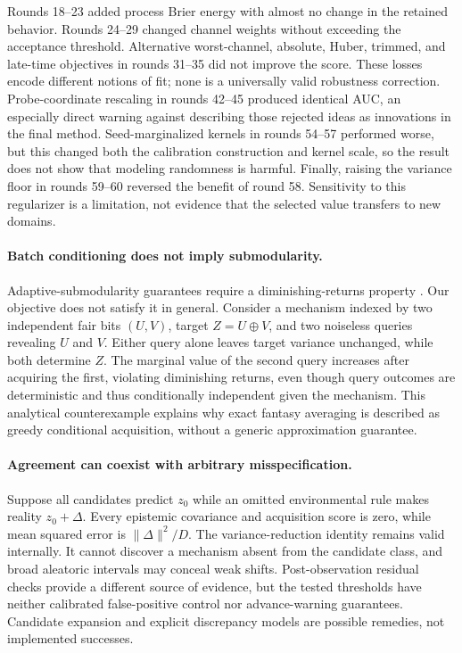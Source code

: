 Rounds 18--23 added process Brier energy with almost no change in the retained behavior. Rounds 24--29 changed channel weights without exceeding the acceptance threshold. Alternative worst-channel, absolute, Huber, trimmed, and late-time objectives in rounds 31--35 did not improve the score. These losses encode different notions of fit; none is a universally valid robustness correction. Probe-coordinate rescaling in rounds 42--45 produced identical AUC, an especially direct warning against describing those rejected ideas as innovations in the final method. Seed-marginalized kernels in rounds 54--57 performed worse, but this changed both the calibration construction and kernel scale, so the result does not show that modeling randomness is harmful. Finally, raising the variance floor in rounds 59--60 reversed the benefit of round 58. Sensitivity to this regularizer is a limitation, not evidence that the selected value transfers to new domains.

\paragraph{Batch conditioning does not imply submodularity.}
Adaptive-submodularity guarantees require a diminishing-returns property \citep{golovin2011}. Our objective does not satisfy it in general. Consider a mechanism indexed by two independent fair bits $(U,V)$, target $Z=U\oplus V$, and two noiseless queries revealing $U$ and $V$. Either query alone leaves target variance unchanged, while both determine $Z$. The marginal value of the second query increases after acquiring the first, violating diminishing returns, even though query outcomes are deterministic and thus conditionally independent given the mechanism. This analytical counterexample explains why exact fantasy averaging is described as greedy conditional acquisition, without a generic approximation guarantee.

\paragraph{Agreement can coexist with arbitrary misspecification.}
Suppose all candidates predict $z_0$ while an omitted environmental rule makes reality $z_0+\Delta$. Every epistemic covariance and acquisition score is zero, while mean squared error is $\|\Delta\|^2/D$. The variance-reduction identity remains valid internally. It cannot discover a mechanism absent from the candidate class, and broad aleatoric intervals may conceal weak shifts. Post-observation residual checks provide a different source of evidence, but the tested thresholds have neither calibrated false-positive control nor advance-warning guarantees. Candidate expansion and explicit discrepancy models are possible remedies, not implemented successes.

